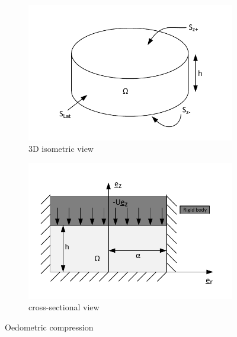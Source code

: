 \documentclass[letter,12pt]{article}
\begin{document}
\begin{figure}[ht]
	\centering
	\begin{subfigure}{.35\textwidth}
		\centering
		\includegraphics[width=1\linewidth]{figures/problem4_isometric}
		\caption{3D isometric view}
	\end{subfigure}
	\hspace{10mm}
	\begin{subfigure}{.45\textwidth}
		\hspace{0.5cm}
		\includegraphics[width=1\linewidth]{figures/problem4_2d}
		\caption{cross-sectional view}
	\end{subfigure}	
	\caption{Oedometric compression}
	\label{fig:problem4}
\end{figure}


\end{document}
